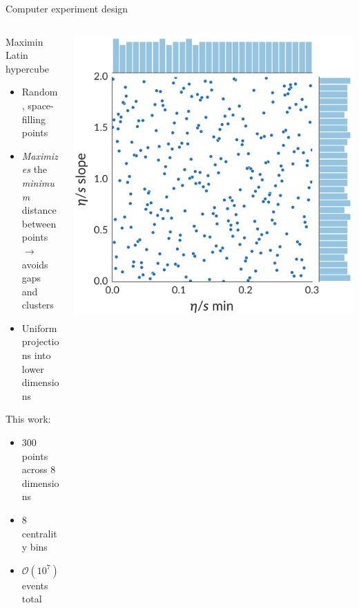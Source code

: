 \documentclass[xcolor=dvipsnames]{beamer}
\begin{document}
\begin{frame}{Computer experiment design}
    \begin{columns}
    \begin{column}{0.52\textwidth} 
        Maximin Latin hypercube
        \begin{itemize}
            \item Random, space-filling points
            \item \emph{Maximizes} the \emph{minimum}\\
                distance between points\\
                $\rightarrow$ avoids gaps and clusters
            \item Uniform projections into\\
                lower dimensions
        \end{itemize}
        \medskip
        This work:
        \begin{itemize}
            \item 300 points across 8\\
                dimensions
            \item 8 centrality bins
            \item $\mathcal{O}(10^7)$ events total
        \end{itemize}
    \end{column}
    \begin{column}{0.48\textwidth} 
        \includegraphics[width=\textwidth]{design}
    \end{column}
    \end{columns}
\end{frame}
\end{document}
